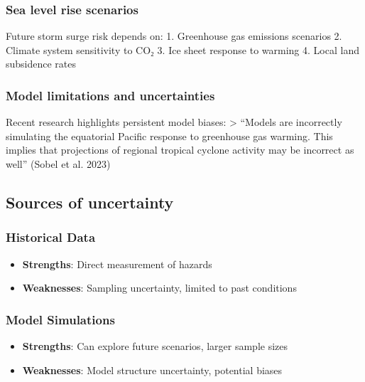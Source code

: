 \documentclass[
  letterpaper,
  DIV=11,
  numbers=noendperiod]{scrreprt}
\providecommand{\tightlist}{%
  \setlength{\itemsep}{0pt}\setlength{\parskip}{0pt}}
\begin{document}
\subsubsection{Sea level rise scenarios}\label{sea-level-rise-scenarios}

Future storm surge risk depends on: 1. Greenhouse gas emissions
scenarios 2. Climate system sensitivity to CO₂ 3. Ice sheet response to
warming 4. Local land subsidence rates

\subsubsection{Model limitations and
uncertainties}\label{model-limitations-and-uncertainties}

Recent research highlights persistent model biases: \textgreater{}
``Models are incorrectly simulating the equatorial Pacific response to
greenhouse gas warming. This implies that projections of regional
tropical cyclone activity may be incorrect as well'' (Sobel et al. 2023)

\subsection{Sources of uncertainty}\label{sources-of-uncertainty}

\subsubsection{Historical Data}\label{historical-data}

\begin{itemize}
\tightlist
\item
  \textbf{Strengths}: Direct measurement of hazards
\item
  \textbf{Weaknesses}: Sampling uncertainty, limited to past conditions
\end{itemize}

\subsubsection{Model Simulations}\label{model-simulations}

\begin{itemize}
\tightlist
\item
  \textbf{Strengths}: Can explore future scenarios, larger sample sizes
\item
  \textbf{Weaknesses}: Model structure uncertainty, potential biases
\end{itemize}
\end{document}
